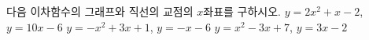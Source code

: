 다음 이차함수의 그래프와 직선의 교점의 $x$좌표를 구하시오.
 $y=2x^2+x-2$, $y=10x-6$
 $y=-x^2+3x+1$, $y=-x-6$
 $y=x^2-3x+7$, $y=3x-2$
